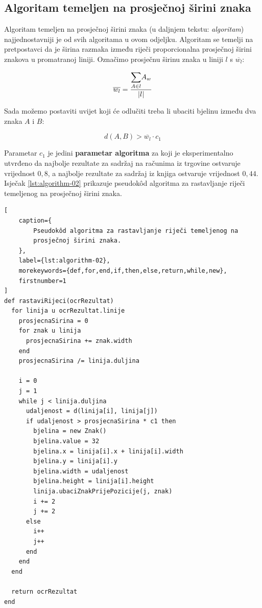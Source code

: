 \documentclass[times, utf8, zavrsni]{fer}
\begin{document}
\subsection{Algoritam temeljen na prosječnoj širini znaka}
\label{subsec:algoritam-temeljen-na-prosjecnoj-sirini znaka}
Algoritam temeljen na prosječnoj širini znaka (u daljnjem tekstu:
\emph{algoritam}) najjednostavniji je od svih algoritama u ovom odjeljku.
Algoritam se temelji na pretpostavci da je širina razmaka između
riječi proporcionalna prosječnoj širini znakova u promatranoj liniji.
Označimo prosječnu širinu znaka u liniji $l$ s $\overline{w_l}$:

\begin{equation}
\overline{w_l} = \frac{\mathlarger{\sum}\limits_{A \in l} A_w}{|l|}
\end{equation}

Sada možemo postaviti uvijet koji će odlučiti treba li ubaciti bjelinu između
dva znaka $A$ i $B$:

\begin{equation}
\label{eq:condition-01}
d(A, B) > \overline{w_l} \cdot c_1
\end{equation}

Parametar $c_1$ je jedini \textbf{parametar algoritma} za koji je
eksperimentalno utvrđeno da najbolje rezultate za sadržaj na računima iz
trgovine ostvaruje vrijednost $0{,}8$, a najbolje rezultate za sadržaj iz
knjiga ostvaruje vrijednost $0{,}44$. Isječak \ref{lst:algorithm-02} prikazuje
pseudokôd algoritma za rastavljanje riječi temeljenog na prosječnoj širini
znaka.

\begin{lstlisting}[
    caption={
        Pseudokôd algoritma za rastavljanje riječi temeljenog na
        prosječnoj širini znaka.
    },
    label={lst:algorithm-02},
    morekeywords={def,for,end,if,then,else,return,while,new},
    firstnumber=1
]
def rastaviRijeci(ocrRezultat)
  for linija u ocrRezultat.linije
    prosjecnaSirina = 0
    for znak u linija
      prosjecnaSirina += znak.width
    end
    prosjecnaSirina /= linija.duljina

    i = 0
    j = 1
    while j < linija.duljina
      udaljenost = d(linija[i], linija[j])
      if udaljenost > prosjecnaSirina * c1 then
        bjelina = new Znak()
        bjelina.value = 32
        bjelina.x = linija[i].x + linija[i].width
        bjelina.y = linija[i].y
        bjelina.width = udaljenost
        bjelina.height = linija[i].height
        linija.ubaciZnakPrijePozicije(j, znak)
        i += 2
        j += 2
      else
        i++
        j++
      end
    end
  end

  return ocrRezultat
end
\end{lstlisting}
\end{document}
